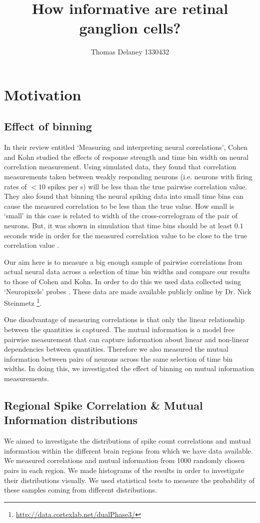 \documentclass[a4paper,12pt]{article}
\title{How informative are retinal ganglion cells?}
\author{Thomas Delaney 1330432}
\theoremstyle{definition}
\begin{document}
\tableofcontents

\newpage

\section{Motivation}
\subsection{Effect of binning}
In their review entitled `Measuring and interpreting neural correlations', Cohen and Kohn studied the effects of response strength and time bin width on neural correlation measurement. Using simulated data, they found that correlation measurements taken between weakly responding neurons (i.e. neurons with firing rates of $<10$ spikes per s) will be less than the true pairwise correlation value. They also found that binning the neural spiking data into small time bins can cause the measured correlation to be less than the true value. How small is `small' in this case is related to width of the cross-correlogram of the pair of neurons. But, it was shown in simulation that time bins should be at least $0.1$ seconds wide in order for the measured correlation value to be close to the true correlation value \cite{cohen}.

Our aim here is to measure a big enough sample of pairwise correlations from actual neural data across a selection of time bin widths and compare our results to those of Cohen and Kohn. In order to do this we used data collected using `Neuropixels' probes \cite{jun}. These data are made available publicly online by Dr. Nick Steinmetz \footnote{\url{http://data.cortexlab.net/dualPhase3/}}.

One disadvantage of measuring correlations is that only the linear relationship between the quantities is captured. The mutual information is a model free pairwise measurement that can capture information about linear and non-linear dependencies between quantities. Therefore we also measured the mutual information between pairs of neurons across the same selection of time bin widths. In doing this, we investigated the effect of binning on mutual information measurements.

\subsection{Regional Spike Correlation \& Mutual Information distributions}
We aimed to investigate the distributions of spike count correlations and mutual information within the different brain regions from which we have data available. We measured correlations and mutual information from $1000$ randomly chosen pairs in each region. We made histograms of the results in order to investigate their distributions visually. We used statistical tests to measure the probability of these samples coming from different distributions.
\end{document}
